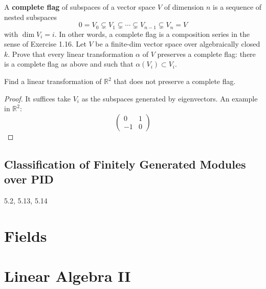 \documentclass[openany]{book}
\newcommand{\R}{\mathbb{R}}
\begin{document}
\begin{prob}[7.15]
    A \textbf{complete flag} of subspaces of a vector space \( V \) of dimension \( n \) is a sequence of nested subspaces
\[
0 = V_0 \subsetneq V_1 \subsetneq \cdots \subsetneq V_{n-1} \subsetneq V_n = V
\]
with \(\dim V_i = i\). In other words, a complete flag is a composition series in the sense of Exercise 1.16. Let $V$ be a finite-dim vector space over algebraically closed $k$. Prove that every linear transformation $\alpha$ of $V$ preserves a complete flag: there is a complete flag as above and such that $\alpha(V_i)\subset V_i$.

Find a linear transformation of $\R^2$ that does not preserve a complete flag.
\end{prob}

\begin{proof}
    It suffices take $V_i$ as the subspaces generated by eigenvectors.
    An example in $\R^2$:
    \begin{equation*}
        \begin{pmatrix}
            0&1\\
            -1&0
        \end{pmatrix}
    \end{equation*}

\end{proof}


\section{Classification of Finitely Generated Modules over PID}

5.2, 5.13, 5.14

































\chapter{Fields}


\chapter{Linear Algebra II}
\end{document}

